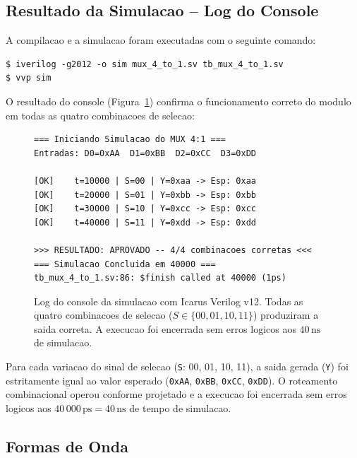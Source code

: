 \documentclass[12pt, a4paper]{article}
\begin{document}
\subsection{Resultado da Simulacao -- Log do Console}

A compilacao e a simulacao foram executadas com o seguinte comando:
\begin{lstlisting}[language={}]
$ iverilog -g2012 -o sim mux_4_to_1.sv tb_mux_4_to_1.sv
$ vvp sim
\end{lstlisting}

O resultado do console (Figura~\ref{fig:console_log}) confirma o funcionamento
correto do modulo em todas as quatro combinacoes de selecao:

\begin{figure}[H]
\centering
\begin{lstlisting}[language={}, frame=single, backgroundcolor=\color{black!92},
  basicstyle=\ttfamily\small\color{green!80!white}, numbers=none]
=== Iniciando Simulacao do MUX 4:1 ===
Entradas: D0=0xAA  D1=0xBB  D2=0xCC  D3=0xDD

[OK]    t=10000 | S=00 | Y=0xaa -> Esp: 0xaa
[OK]    t=20000 | S=01 | Y=0xbb -> Esp: 0xbb
[OK]    t=30000 | S=10 | Y=0xcc -> Esp: 0xcc
[OK]    t=40000 | S=11 | Y=0xdd -> Esp: 0xdd

>>> RESULTADO: APROVADO -- 4/4 combinacoes corretas <<<
=== Simulacao Concluida em 40000 ===
tb_mux_4_to_1.sv:86: $finish called at 40000 (1ps)
\end{lstlisting}
\caption{Log do console da simulacao com Icarus Verilog v12. Todas as quatro
combinacoes de selecao ($S \in \{00, 01, 10, 11\}$) produziram a saida correta.
A execucao foi encerrada sem erros logicos aos $40\,\text{ns}$ de simulacao.}
\label{fig:console_log}
\end{figure}

\begin{resultadobox}
Para cada variacao do sinal de selecao (\texttt{S}: 00, 01, 10, 11), a saida
gerada (\texttt{Y}) foi estritamente igual ao valor esperado (\texttt{0xAA},
\texttt{0xBB}, \texttt{0xCC}, \texttt{0xDD}). O roteamento combinacional operou
conforme projetado e a execucao foi encerrada sem erros logicos aos
$40\,000\,\text{ps} = 40\,\text{ns}$ de tempo de simulacao.
\end{resultadobox}

\subsection{Formas de Onda}
\end{document}
